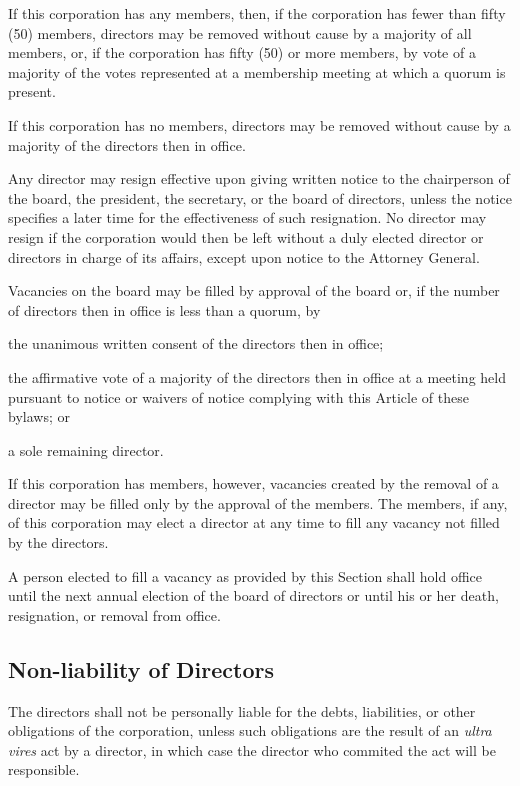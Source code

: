 \documentclass{article}
\begin{document}
	If this corporation has any members, then, if the corporation has fewer than fifty (50) members, directors may be removed without cause by a majority of all members, or, if the corporation has fifty (50) or more members, by vote of a majority of the votes represented at a membership meeting at which a quorum is present.
	
	If this corporation has no members, directors may be removed without cause by a majority of the directors then in office.
	
	Any director may resign effective upon giving written notice to the chairperson of the board, the president, the secretary, or the board of directors, unless the notice specifies a later time for the effectiveness of such resignation. No director may resign if the corporation would then be left without a duly elected director or directors in charge of its affairs, except upon notice to the Attorney General.
	
	Vacancies on the board may be filled by approval of the board or, if the number of directors then in office is less than a quorum, by
	\begin{inparaenum}[\itshape 1\upshape)]
		\item the unanimous written consent of the directors then in office; 
		\item the affirmative vote of a majority of the directors then in office at a meeting held pursuant to notice or waivers of notice complying with this Article of these bylaws; or 
		\item a sole remaining director. 
	\end{inparaenum}
	If this corporation has members, however, vacancies created by the removal of a director may be filled only by the approval of the members. The members, if any, of this corporation may elect a director at any time to fill any vacancy not filled by the directors.
	
	A person elected to fill a vacancy as provided by this Section shall hold office until the next annual election of the board of directors or until his or her death, resignation, or removal from office.
	
	\subsection{Non-liability of Directors}
	The directors shall not be personally liable for the debts, liabilities, or other obligations of the corporation, unless such obligations are the result of an \textit{ultra vires} act by a director, in which case the director who commited the act will be responsible.
	
\end{document}
